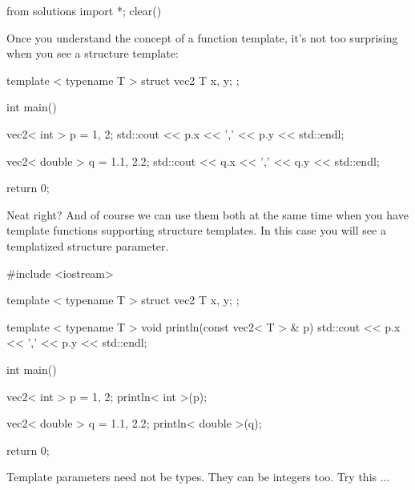 \begin{python0}
from solutions import *; clear()
\end{python0}

Once you understand the concept of a function template,
it's not too surprising when you see a structure
template:

\begin{consolethree}[escapeinside=||]
template < typename T >
struct vec2
{
    T x, y;
};

int main()
{
    vec2< int > p = {1, 2};
    std::cout << p.x << ',' << p.y << std::endl;

    vec2< double > q = {1.1, 2.2};
    std::cout << q.x << ',' << q.y << std::endl;

    return 0;
}
\end{consolethree}

Neat right? And of course we can use them both at the same time when you
have template functions supporting structure templates. In this case you
will see a templatized structure parameter.

\begin{consolethree}[escapeinside=||]
#include <iostream>

template < typename T >
struct vec2
{
    T x, y;
};

template < typename T >
void println(const vec2< T > & p)
{
    std::cout << p.x << ',' << p.y << std::endl;
}

int main()
{
    vec2< int > p = {1, 2};
    println< int >(p);

    vec2< double > q = {1.1, 2.2};
    println< double >(q);

    return 0;
}
\end{consolethree}



Template parameters need not be types. They can be integers too. Try
this ...



